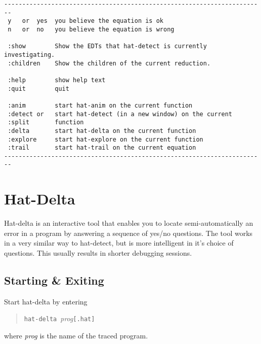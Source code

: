 \documentclass[12pt]{article}
\begin{document}
\begin{verbatim}
------------------------------------------------------------------------
 y   or  yes  you believe the equation is ok
 n   or  no   you believe the equation is wrong

 :show        Show the EDTs that hat-detect is currently investigating.
 :children    Show the children of the current reduction.

 :help        show help text
 :quit        quit

 :anim        start hat-anim on the current function
 :detect or   start hat-detect (in a new window) on the current
 :split       function
 :delta       start hat-delta on the current function
 :explore     start hat-explore on the current function
 :trail       start hat-trail on the current equation
------------------------------------------------------------------------
\end{verbatim}


\section{Hat-Delta}

Hat-delta is an interactive tool that enables you to locate
semi-automatically an error in a program by answering a sequence
of yes/no questions.  The tool works in a very similar way to hat-detect, but
is more intelligent in it's choice of questions.  This usually results in
shorter debugging sessions.

\subsection{Starting \& Exiting}

Start hat-delta by entering
\begin{quote}
\texttt{hat-delta}~\emph{prog}\texttt{[.hat]}
\end{quote}
where \emph{prog} is the name of the traced program.
\end{document}
